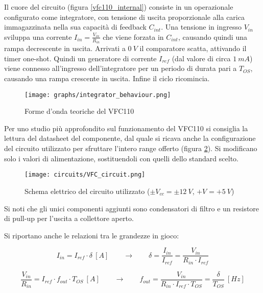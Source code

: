 Il cuore del circuito (figura \ref{vfc110_internal}) consiste in un operazionale configurato
come integratore, con tensione di uscita proporzionale alla carica immagazzinata nella sua
capacità di feedback $C_{int}$. Una tensione in ingresso $V_{in}$ sviluppa una corrente
$I_{in}=\frac{V_{in}}{R_{in}}$ che viene forzata in $C_{int}$, causando quindi una rampa
decrescente in uscita. Arrivati a $0\ V$ il comparatore scatta, attivando il timer one-shot.
Quindi un generatore di corrente $I_{ref}$ (dal valore di circa $1\ mA$) viene connesso
all'ingresso dell'integratore per un periodo di durata pari a $T_{OS}$, causando una rampa
crescente in uscita. Infine il ciclo ricomincia.

\begin{figure}[H]
    \centering
    \texttt{[image: graphs/integrator\_behaviour.png]}
    \caption{Forme d'onda teoriche del VFC110}
    \label{integrator_behaviour}
\end{figure}

Per uno studio più approfondito sul funzionamento del VFC110 si consiglia la lettura del
datasheet del componente, dal quale si ricava anche la configurazione del circuito utilizzato
per sfruttare l'intero range offerto (figura \ref{VFC_circuit}). Si modificano solo i valori
di alimentazione, sostituendoli con quelli dello standard scelto.

\begin{figure}[H]
    \centering
    \texttt{[image: circuits/VFC\_circuit.png]}
    \caption{Schema elettrico del circuito utilizzato ($\pm V_{cc}=\pm 12\ V$, $+V_{}=+5\ V$)}
    \label{VFC_circuit}
\end{figure}

Si noti che gli unici componenti aggiunti sono condensatori di filtro e un resistore di
pull-up per l'uscita a collettore aperto.

Si riportano anche le relazioni tra le grandezze in gioco:

\begin{equation}\label{duty_cycle}
    I_{in}=I_{ref}\cdot\delta\ [A]
    \qquad
    \rightarrow
    \qquad
    \delta=\frac{I_{in}}{I_{ref}}=\frac{V_{in}}{R_{in}\cdot I_{ref}}
\end{equation}

\begin{equation}\label{fout}
    \frac{V_{in}}{R_{in}}=I_{ref}\cdot f_{out}\cdot T_{OS}\ [A]
    \qquad
    \rightarrow
    \qquad
    f_{out}=\frac{V_{in}}{R_{in}\cdot I_{ref}\cdot T_{OS}}=\frac{\delta}{T_{OS}}\ [Hz]
\end{equation}


